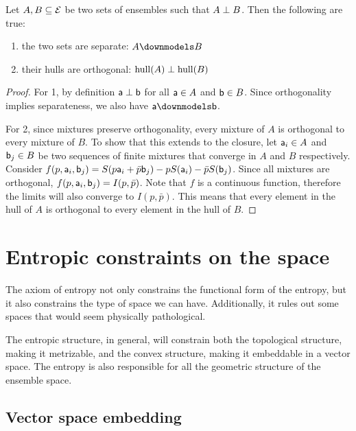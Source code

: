 \begin{mathSection}
\begin{prop}
	Let $A, B \subseteq \Ens$ be two sets of ensembles such that $A \ortho B$. Then the following are true:
	\begin{enumerate}
		\item the two sets are separate: $A \separate B$
		\item their hulls are orthogonal: $\hull(A) \ortho \hull(B)$
	\end{enumerate}
\end{prop}

\begin{proof}
	For 1, by definition $\ens[a] \ortho \ens[b]$ for all $\ens[a] \in A$ and $\ens[b] \in B$. Since orthogonality implies separateness, we also have $\ens[a] \separate \ens[b]$.
	
	For 2, since mixtures preserve orthogonality, every mixture of $A$ is orthogonal to every mixture of $B$. To show that this extends to the closure, let $\ens[a]_i \in A$ and $\ens[b]_j \in B$ be two sequences of finite mixtures that converge in $A$ and $B$ respectively. Consider $f(p,\ens[a]_i, \ens[b]_j) = S(p \ens[a]_i + \bar{p} \ens[b]_j) - p S(\ens[a]_i) - \bar{p} S(\ens[b]_j)$. Since all mixtures are orthogonal, $f(p,\ens[a]_i, \ens[b]_j) = I(p,\bar{p})$. Note that $f$ is a continuous function, therefore the limits will also converge to $I(p,\bar{p})$. This means that every element in the hull of $A$ is orthogonal to every element in the hull of $B$.
\end{proof}
\end{mathSection}

\section{Entropic constraints on the space}

The axiom of entropy not only constrains the functional form of the entropy, but it also constrains the type of space we can have. Additionally, it rules out some spaces that would seem physically pathological.

The entropic structure, in general, will constrain both the topological structure, making it metrizable, and the convex structure, making it embeddable in a vector space. The entropy is also responsible for all the geometric structure of the ensemble space.


\subsection{Vector space embedding}

